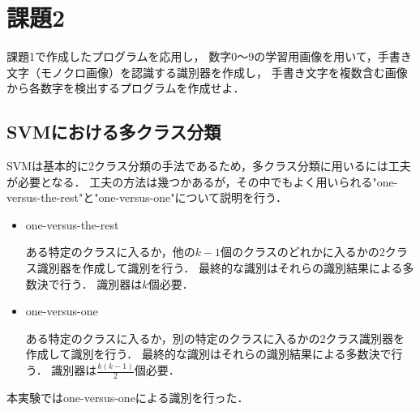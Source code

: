 \section*{課題2}
課題1で作成したプログラムを応用し， 数字0～9の学習用画像を用いて，手書き文字（モノクロ画像）を認識する識別器を作成し， 手書き文字を複数含む画像から各数字を検出するプログラムを作成せよ．

\subsection*{SVMにおける多クラス分類}
SVMは基本的に2クラス分類の手法であるため，多クラス分類に用いるには工夫が必要となる．
工夫の方法は幾つかあるが，その中でもよく用いられる"one-versus-the-rest"と"one-versus-one"について説明を行う．\par
\begin{itemize}
    \setlength{\itemsep}{3mm}
    \item one-versus-the-rest\par
    \vspace{1mm}
    \quad
    ある特定のクラスに入るか，他の$k-1$個のクラスのどれかに入るかの2クラス識別器を作成して識別を行う．
    最終的な識別はそれらの識別結果による多数決で行う．
    識別器は$k$個必要．
    \item one-versus-one\par
    \vspace{1mm}
    \quad
    ある特定のクラスに入るか，別の特定のクラスに入るかの2クラス識別器を作成して識別を行う．
    最終的な識別はそれらの識別結果による多数決で行う．
    識別器は$\frac{k(k−1)}{2}$個必要．
\end{itemize}
本実験ではone-versus-oneによる識別を行った．

